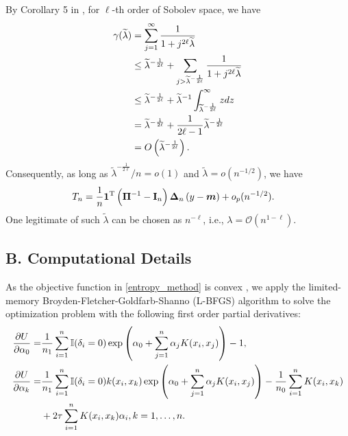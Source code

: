 \documentclass[12pt]{article}
\newcommand{\by}{{y}}
\newcommand{\bmm}{\bm{m}}
\newcommand{\bI}{\mathbf{I}}
\newcommand{\bone}{\mathbf{1}}
\newcommand{\bDelta}{\boldsymbol{\Delta}}
\newcommand{\bPi}{\boldsymbol{\Pi}}
\def\trans{^{\rm T}}
\def\wt{\widetilde}
\begin{document}
By Corollary 5 in \citet{zhang2013divide}, for $\ell$-th order of Sobolev space, we have
\begin{align}
  \gamma(\wt{\lambda})  &= \sum_{j=1}^{\infty} \frac{1}{1 + j^{2\ell}\wt{\lambda} } \notag\\
  &\leq \wt{\lambda}^{-\frac{1}{2\ell}}  + \sum_{j >\wt{\lambda} ^{-\frac{1}{2\ell}}} \frac{1}{ 1 + j^{2\ell} \wt{\lambda}} \notag\\
  &\leq \wt{\lambda}^{-\frac{1}{2\ell}} + \wt{\lambda}^{-1} \int_{\wt{\lambda}^{-\frac{1}{2\ell}}}^{\infty}z dz \notag \\
  &= \wt{\lambda}^{-\frac{1}{2\ell}}  + \frac{1}{2\ell-1}\wt{\lambda} ^{-\frac{1}{2\ell}} \notag\\
  &= O\left(\wt{\lambda}^{-\frac{1}{2\ell}}\right).
\end{align}
Consequently, as long as $\wt{\lambda}^{-\frac{1}{2\ell}} / n = o(1)$ and $\wt{\lambda} = o(n^{-1/2})$, we have
\begin{align} 
T_{n} &=  \frac{1}{n}\bone\trans \left(\bPi^{-1} - \bI_{n}\right) \bDelta_{n}  \left(  \by - \bmm      \right) + o_{p}(n^{-1/2}).
\end{align}
One legitimate of such $\wt{\lambda}$ can be chosen as $n^{-\ell}$, i.e., $\lambda = \mathcal{O}(n^{1-\ell})$.

\subsection*{B. Computational Details }


As the objective function in \eqref{entropy_method} is convex \citep{nguyen2010}, we apply the limited-memory Broyden-Fletcher-Goldfarb-Shanno (L-BFGS) algorithm to solve 
the optimization problem with the following first order partial derivatives:
\begin{align}
  \frac{\partial U }{\partial \alpha_{0}} = & 
   \frac{1}{n_{1}}\sum_{i=1}^{n}\mathbb{I}(\delta_{i} = 0)\exp\left( \alpha_{0} + \sum_{j=1}^{n}\alpha_{j}K(x_{i}, x_{j})  \right) - 1,\notag\\
   \frac{\partial U }{\partial \alpha_{k}} = & \frac{1}{n_{1}}\sum_{i=1}^{n}\mathbb{I}(\delta_{i} = 0)k(x_{i}, x_{k})\exp\left( \alpha_{0} + \sum_{j=1}^{n}\alpha_{j}K(x_{i}, x_{j})  \right) 
   - \frac{1}{n_{0}}\sum_{i=1}^{n}K(x_{i}, x_{k}) \notag\\
   &+ 2  \tau\sum_{i=1}^{n}K(x_{i}, x_{k})\alpha_{i}, k = 1, \ldots, n. \notag
\end{align}
\end{document}
